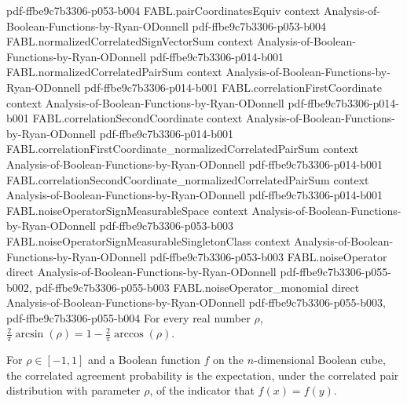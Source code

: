\begin{theorem}
  {pdf-ffbe9c7b3306-p053-b004}
\proofstep
  {FABL.pairCoordinatesEquiv}
  {context}
  {Analysis-of-Boolean-Functions-by-Ryan-ODonnell}
  {pdf-ffbe9c7b3306-p053-b004}
\proofstep
  {FABL.normalizedCorrelatedSignVectorSum}
  {context}
  {Analysis-of-Boolean-Functions-by-Ryan-ODonnell}
  {pdf-ffbe9c7b3306-p014-b001}
\proofstep
  {FABL.normalizedCorrelatedPairSum}
  {context}
  {Analysis-of-Boolean-Functions-by-Ryan-ODonnell}
  {pdf-ffbe9c7b3306-p014-b001}
\proofstep
  {FABL.correlationFirstCoordinate}
  {context}
  {Analysis-of-Boolean-Functions-by-Ryan-ODonnell}
  {pdf-ffbe9c7b3306-p014-b001}
\proofstep
  {FABL.correlationSecondCoordinate}
  {context}
  {Analysis-of-Boolean-Functions-by-Ryan-ODonnell}
  {pdf-ffbe9c7b3306-p014-b001}
\proofstep
  {FABL.correlationFirstCoordinate_normalizedCorrelatedPairSum}
  {context}
  {Analysis-of-Boolean-Functions-by-Ryan-ODonnell}
  {pdf-ffbe9c7b3306-p014-b001}
\proofstep
  {FABL.correlationSecondCoordinate_normalizedCorrelatedPairSum}
  {context}
  {Analysis-of-Boolean-Functions-by-Ryan-ODonnell}
  {pdf-ffbe9c7b3306-p014-b001}
\proofstep
  {FABL.noiseOperatorSignMeasurableSpace}
  {context}
  {Analysis-of-Boolean-Functions-by-Ryan-ODonnell}
  {pdf-ffbe9c7b3306-p053-b003}
\proofstep
  {FABL.noiseOperatorSignMeasurableSingletonClass}
  {context}
  {Analysis-of-Boolean-Functions-by-Ryan-ODonnell}
  {pdf-ffbe9c7b3306-p053-b003}
\proofstep
  {FABL.noiseOperator}
  {direct}
  {Analysis-of-Boolean-Functions-by-Ryan-ODonnell}
  {pdf-ffbe9c7b3306-p055-b002,
    pdf-ffbe9c7b3306-p055-b003}
\proofstep
  {FABL.noiseOperator_monomial}
  {direct}
  {Analysis-of-Boolean-Functions-by-Ryan-ODonnell}
  {pdf-ffbe9c7b3306-p055-b003,
    pdf-ffbe9c7b3306-p055-b004}
\label{FABL.two_div_pi_mul_arcsin_eq_one_sub_two_div_pi_mul_arccos}
\leanok
{}
For every real number $\rho$, $\frac{2}{\pi}\arcsin(\rho)=1-\frac{2}{\pi}\arccos(\rho)$.
\end{theorem}

\begin{definition}
\label{FABL.correlatedAgreementProbability}
\leanok
{}
For $\rho\in[-1,1]$ and a Boolean function $f$ on the $n$-dimensional Boolean cube, the
correlated agreement probability is the expectation, under the correlated pair
distribution with parameter $\rho$, of the indicator that $f(x)=f(y)$.
\end{definition}


